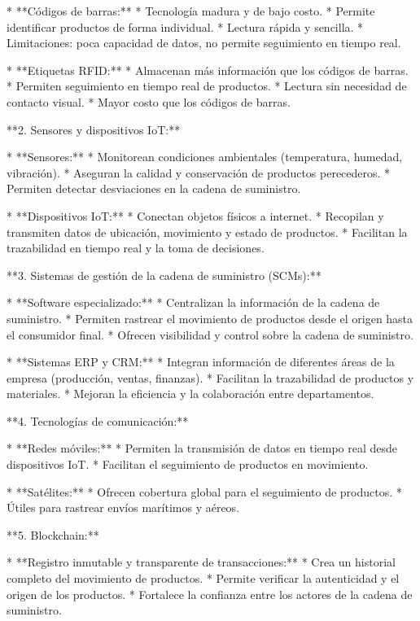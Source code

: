 \documentclass[main.tex]{subfiles}
\begin{document}
* **Códigos de barras:**
    * Tecnología madura y de bajo costo.
    * Permite identificar productos de forma individual.
    * Lectura rápida y sencilla.
    * Limitaciones: poca capacidad de datos, no permite seguimiento en tiempo real.

* **Etiquetas RFID:**
    * Almacenan más información que los códigos de barras.
    * Permiten seguimiento en tiempo real de productos.
    * Lectura sin necesidad de contacto visual.
    * Mayor costo que los códigos de barras.

**2. Sensores y dispositivos IoT:**

* **Sensores:**
    * Monitorean condiciones ambientales (temperatura, humedad, vibración).
    * Aseguran la calidad y conservación de productos perecederos.
    * Permiten detectar desviaciones en la cadena de suministro.

* **Dispositivos IoT:**
    * Conectan objetos físicos a internet.
    * Recopilan y transmiten datos de ubicación, movimiento y estado de productos.
    * Facilitan la trazabilidad en tiempo real y la toma de decisiones.

**3. Sistemas de gestión de la cadena de suministro (SCMs):**

* **Software especializado:**
    * Centralizan la información de la cadena de suministro.
    * Permiten rastrear el movimiento de productos desde el origen hasta el consumidor final.
    * Ofrecen visibilidad y control sobre la cadena de suministro.

* **Sistemas ERP y CRM:**
    * Integran información de diferentes áreas de la empresa (producción, ventas, finanzas).
    * Facilitan la trazabilidad de productos y materiales.
    * Mejoran la eficiencia y la colaboración entre departamentos.

**4. Tecnologías de comunicación:**

* **Redes móviles:**
    * Permiten la transmisión de datos en tiempo real desde dispositivos IoT.
    * Facilitan el seguimiento de productos en movimiento.

* **Satélites:**
    * Ofrecen cobertura global para el seguimiento de productos.
    * Útiles para rastrear envíos marítimos y aéreos.

**5. Blockchain:**

* **Registro inmutable y transparente de transacciones:**
    * Crea un historial completo del movimiento de productos.
    * Permite verificar la autenticidad y el origen de los productos.
    * Fortalece la confianza entre los actores de la cadena de suministro.
\end{document}
